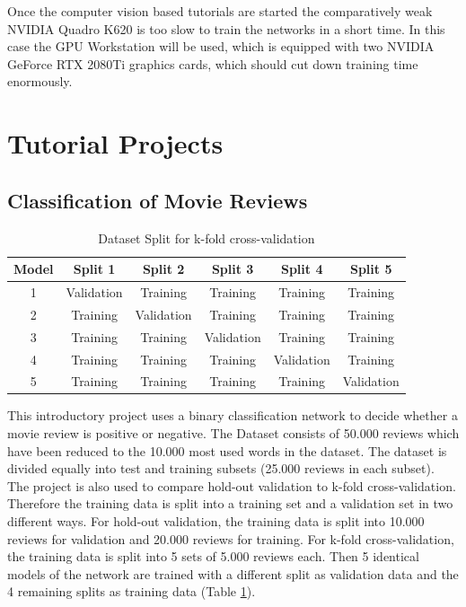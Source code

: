 \documentclass[sigconf]{acmart}
\begin{document}
Once the computer vision based tutorials are started the comparatively weak NVIDIA Quadro K620 is too slow to train the networks in a short time.
In this case the GPU Workstation will be used, which is equipped with two NVIDIA GeForce RTX 2080Ti graphics cards, which should cut down training time enormously.

\section{Tutorial Projects}
\subsection{Classification of Movie Reviews}

\begin{table}[h!]
  \caption{Dataset Split for k-fold cross-validation}
  \label{tab:k-fold}
  \begin{tabular}{ c c c c c c }
    \toprule
    Model & Split 1 & Split 2 & Split 3 & Split 4 & Split 5 \\
    \midrule
    1 & Validation & Training & Training & Training & Training \\
    2 & Training & Validation & Training & Training & Training \\
	3 & Training & Training & Validation & Training & Training \\
	4 & Training & Training & Training & Validation & Training \\
	5 & Training & Training & Training & Training & Validation \\
  	\bottomrule
  \end{tabular}
\end{table}

This introductory project uses a binary classification network to decide whether a movie review is positive or negative.
The Dataset consists of 50.000 reviews which have been reduced to the 10.000 most used words in the dataset.
The dataset is divided equally into test and training subsets (25.000 reviews in each subset).
The project is also used to compare hold-out validation to k-fold cross-validation.
Therefore the training data is split into a training set and a validation set in two different ways.
For hold-out validation, the training data is split into 10.000 reviews for validation and 20.000 reviews for training.
For k-fold cross-validation, the training data is split into 5 sets of 5.000 reviews each.
Then 5 identical models of the network are trained with a different split as validation data and the 4 remaining splits as training data (Table \ref{tab:k-fold}).
\end{document}
